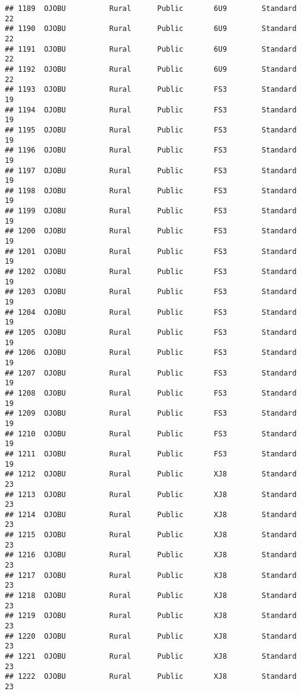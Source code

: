 \documentclass[
]{article}
\begin{document}
\begin{verbatim}
## 1189  OJOBU          Rural      Public       6U9        Standard        22
## 1190  OJOBU          Rural      Public       6U9        Standard        22
## 1191  OJOBU          Rural      Public       6U9        Standard        22
## 1192  OJOBU          Rural      Public       6U9        Standard        22
## 1193  OJOBU          Rural      Public       FS3        Standard        19
## 1194  OJOBU          Rural      Public       FS3        Standard        19
## 1195  OJOBU          Rural      Public       FS3        Standard        19
## 1196  OJOBU          Rural      Public       FS3        Standard        19
## 1197  OJOBU          Rural      Public       FS3        Standard        19
## 1198  OJOBU          Rural      Public       FS3        Standard        19
## 1199  OJOBU          Rural      Public       FS3        Standard        19
## 1200  OJOBU          Rural      Public       FS3        Standard        19
## 1201  OJOBU          Rural      Public       FS3        Standard        19
## 1202  OJOBU          Rural      Public       FS3        Standard        19
## 1203  OJOBU          Rural      Public       FS3        Standard        19
## 1204  OJOBU          Rural      Public       FS3        Standard        19
## 1205  OJOBU          Rural      Public       FS3        Standard        19
## 1206  OJOBU          Rural      Public       FS3        Standard        19
## 1207  OJOBU          Rural      Public       FS3        Standard        19
## 1208  OJOBU          Rural      Public       FS3        Standard        19
## 1209  OJOBU          Rural      Public       FS3        Standard        19
## 1210  OJOBU          Rural      Public       FS3        Standard        19
## 1211  OJOBU          Rural      Public       FS3        Standard        19
## 1212  OJOBU          Rural      Public       XJ8        Standard        23
## 1213  OJOBU          Rural      Public       XJ8        Standard        23
## 1214  OJOBU          Rural      Public       XJ8        Standard        23
## 1215  OJOBU          Rural      Public       XJ8        Standard        23
## 1216  OJOBU          Rural      Public       XJ8        Standard        23
## 1217  OJOBU          Rural      Public       XJ8        Standard        23
## 1218  OJOBU          Rural      Public       XJ8        Standard        23
## 1219  OJOBU          Rural      Public       XJ8        Standard        23
## 1220  OJOBU          Rural      Public       XJ8        Standard        23
## 1221  OJOBU          Rural      Public       XJ8        Standard        23
## 1222  OJOBU          Rural      Public       XJ8        Standard        23

\end{verbatim}
\end{document}
